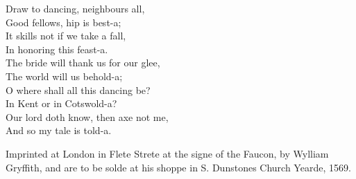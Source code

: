\begin{dcverse}
\begin{altverse}
Draw to dancing, neighbours all,\\
Good fellows, hip is best-a;\\
It skills not if we take a fall,\\
In honoring this feast-a.\\
The bride will thank us for our glee,\\
The world will us behold-a;\\
O where shall all this dancing be?\\
In Kent or in Cotswold-a?\\
Our lord doth know, then axe not me,\\
And so my tale is told-a.
\end{altverse}
\end{dcverse}

Imprinted at London in Flete Strete at the signe of the Faucon, by Wylliam
Gryffith, and are to be solde at his shoppe in S. Dunstones Church Yearde, 1569.

\centerrule
\pagebreak
